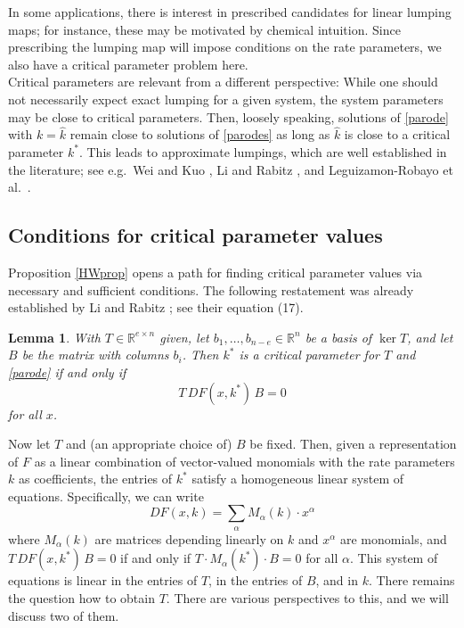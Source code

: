 \documentclass{article}
\newtheorem{lemma}{Lemma}
\begin{document}
In some applications, there is interest in prescribed candidates for linear lumping maps; for instance, these may be motivated by chemical intuition. Since prescribing the lumping map will impose conditions on the rate parameters, we also have a critical parameter problem here.\\

Critical parameters are relevant from a different perspective: While one should not necessarily expect exact lumping for a given system, the system parameters may be close to critical parameters.
Then, loosely speaking, solutions of \eqref{parode} with $k=\widehat k$ remain close to solutions of \eqref{parodes} as long as $\widehat k$ is close to a critical parameter $k^*$. This leads to approximate lumpings, which are well established in the literature; see e.g.\ Wei and Kuo \cite{WK1969b}, Li and Rabitz \cite{LR1990}, and Leguizamon-Robayo et al.\ \cite{LJTTV}.

\subsection{Conditions for critical parameter values}
Proposition \ref{HWprop} opens a path for finding critical parameter values via necessary and sufficient conditions. The following restatement was already established by Li and Rabitz \cite{LR1989}; see their equation (17).
\begin{lemma}\label{lalem}
With $T\in\mathbb R^{e\times n}$ given, let $b_1,\ldots,b_{n-e}\in\mathbb R^n$ be a basis of $\ker T$, and let $B$ be the matrix with columns $b_i$. Then $k^*$ is a critical parameter for $T$ and \eqref{parode} if and only if 
\begin{equation}\label{linparcond}
T\,DF(x,k^*)\,B=0
\end{equation}
for all $x$.
\end{lemma} 
Now let $T$ and (an appropriate choice of) $B$ be fixed. Then,
given a representation of $F$ as a linear combination of vector-valued monomials with the rate parameters $k$ as coefficients, the entries of $k^*$ satisfy a homogeneous linear system of equations. 
Specifically, we can write
\begin{equation}\label{eq:multiindex}
DF(x,k) = \sum_{\alpha} M_\alpha(k) \cdot x^\alpha
\end{equation}
where $M_\alpha(k)$ are matrices depending linearly on $k$ and $x^\alpha$ are monomials,
and $T\,DF(x,k^*)\,B=0$ if and only if $T \cdot M_\alpha(k^*) \cdot B = 0$ for all $\alpha$. This system of equations is linear in the entries of $T$, in the entries of $B$, and in $k$.
There remains the question how to obtain $T$. There are various perspectives to this, and we will discuss two of them.
\end{document}
